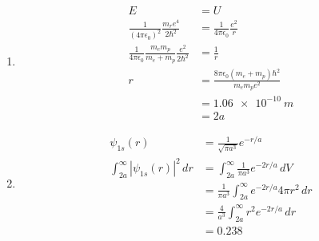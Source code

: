 \documentclass{article}
\begin{document}
\begin{enumerate}
  \item

        \begin{align*}
          E                                                                          & = U                                                        \\
          \frac{1}{(4 \pi \epsilon_0)^2} \frac{m_r e^4}{2 \hbar^2}                   & = \frac{1}{4 \pi \epsilon_0} \frac{e^2}{r}                 \\
          \frac{1}{4 \pi \epsilon_0} \frac{m_e m_p}{m_e + m_p} \frac{e^2}{2 \hbar^2} & = \frac{1}{r}                                              \\
          r                                                                          & = \frac{8 \pi \epsilon_0 (m_e + m_p) \hbar^2}{m_e m_p e^2} \\
                                                                                     & = \qty{1.06e-10}{m}                                        \\
                                                                                     & = 2 a
        \end{align*}

  \item

        \begin{align*}
          \psi_{1s}(r)                            & = \frac{1}{\sqrt{\pi a^3}} e^{-r / a}                             \\
          \int_{2 a}^\infty |\psi_{1s}(r)|^2 \,dr & = \int_{2 a}^\infty \frac{1}{\pi a^3} e^{-2 r / a} \,dV           \\
                                                  & = \frac{1}{\pi a^3} \int_{2 a}^\infty e^{-2 r / a} 4 \pi r^2 \,dr \\
                                                  & = \frac{4}{a^3} \int_{2 a}^\infty r^2 e^{-2 r / a} \,dr           \\
                                                  & = 0.238
        \end{align*}
\end{enumerate}

\setcounter{subsubsection}{50}
\subsubsection{}
\end{document}
